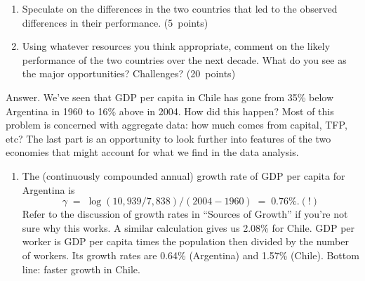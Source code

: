 \documentclass[letterpaper,12pt]{article}
\begin{document}
\begin{enumerate}
\begin{enumerate}
\item Speculate on the differences in the two countries 
that led to the observed differences in their performance.  (5~points)


\item Using whatever resources you think appropriate, 
comment on the likely performance of the two countries over the next 
decade.  
What do you see as the major opportunities?  Challenges?  (20~points) 

\end{enumerate}


Answer.  
We've seen that GDP per capita in Chile has gone 
from 35\% below Argentina in 1960 to 16\% above in 2004.
How did this happen?
Most of this problem is concerned with aggregate data:
how much comes from capital, TFP, etc?  
The last part is an opportunity to look further 
into features of the two economies that might account 
for what we find in the data analysis.  
%
\begin{enumerate}
\item The (continuously compounded annual) 
growth rate of GDP per capita for Argentina is 
\[
    \gamma \;=\; \log (10,939/7,838) / (2004 - 1960) \;=\; 0.76\%. (!) 
\]
Refer to the discussion of growth rates in ``Sources of Growth''
if you're not sure why this works.
A similar calculation gives us 2.08\% for Chile.  
GDP per worker is GDP per capita times the population then
divided by the number of workers.  
Its growth rates are 0.64\% (Argentina) and 1.57\% (Chile).  
Bottom line:  faster growth in Chile.  



\end{enumerate}
\end{enumerate}
\end{document}
